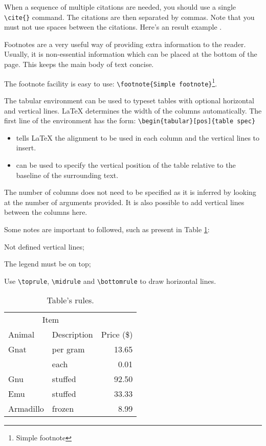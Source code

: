 When a sequence of multiple citations are needed, you should use a single \verb!\cite{}! command. The citations are then separated by commas. Note that you must not use spaces between the citations. Here's an result example \cite{strunk,chicago,texbook}.

Footnotes are a very useful way of providing extra information to the reader. Usually, it is non-essential information which can be placed at the bottom of the page. This keeps the main body of text concise.

The footnote facility is easy to use: \verb!\footnote{Simple footnote}!\footnote{Simple footnote}. 

The tabular environment can be used to typeset tables with optional horizontal and vertical lines. LaTeX determines the width of the columns automatically. The first line of the environment has the form: 
\verb!\begin{tabular}[pos]{table spec}!

\begin{itemize}
\item[table spec] tells LaTeX the alignment to be used in each column and the vertical lines to insert.
\item[pos] can be used to specify the vertical position of the table relative to the baseline of the surrounding text. 
\end{itemize}

The number of columns does not need to be specified as it is inferred by looking at the number of arguments provided. It is also possible to add vertical lines between the columns here. 

Some notes are important to followed, such as present in Table \ref{tab:results}: 
\begin{asparaenum}[i)]
	\item Not defined vertical lines;
	\item The legend must be on top;
	\item Use \verb!\toprule!, \verb!\midrule! and \verb!\bottomrule! to draw horizontal lines.
\end{asparaenum}
 
\begin{table}[ht]
	\caption{Table's rules.}
	\label{tab:results}
\centering
\begin{tabular}{llr}
\toprule
\multicolumn{2}{c}{Item} \\
\cmidrule(r){1-2}
Animal & Description & Price (\$) 
\\
\midrule
Gnat  & per gram & 13.65 \\
      & each     &  0.01 \\
Gnu   & stuffed  & 92.50 \\
Emu   & stuffed  & 33.33 \\
Armadillo & frozen & 8.99 \\
\bottomrule
\end{tabular}
\end{table}

